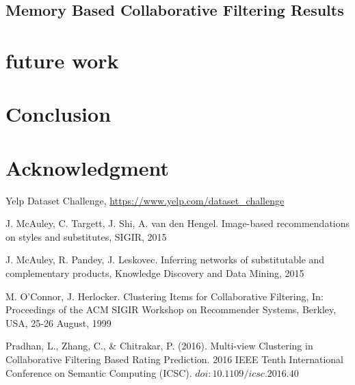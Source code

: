 \documentclass[conference]{IEEEtran}
\begin{document}
\subsection{Memory Based Collaborative Filtering Results}


\section{future work}

\section{Conclusion}




\section*{Acknowledgment}








\begin{thebibliography}{1}

\bibitem{}
Yelp Dataset Challenge, \url{https://www.yelp.com/dataset_challenge}

J. McAuley, C. Targett, J. Shi, A. van den Hengel. Image-based recommendations on styles and substitutes, SIGIR, 2015

J. McAuley, R. Pandey, J. Leskovec. Inferring networks of substitutable and complementary products, Knowledge Discovery and Data Mining, 2015

M. O’Connor, J. Herlocker. Clustering Items for Collaborative Filtering, In: Proceedings of the ACM SIGIR Workshop on Recommender Systems, Berkley, USA, 25-26 August, 1999

Pradhan, L., Zhang, C., \& Chitrakar, P. (2016). Multi-view Clustering in Collaborative Filtering Based Rating Prediction. 2016 IEEE Tenth International Conference on Semantic Computing (ICSC). $doi:10.1109/icsc.2016.40$

\end{thebibliography}
\end{document}
